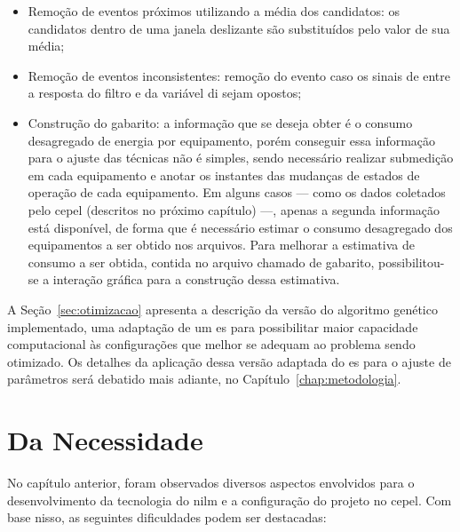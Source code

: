 \begin{itemize}
\item Remoção de eventos próximos utilizando a média dos candidatos:
os candidatos dentro de uma janela deslizante são substituídos pelo valor
de sua média;
\item Remoção de eventos inconsistentes: remoção do evento caso os
sinais de entre a resposta do filtro e da variável \acs{di} sejam
opostos;
\item Construção do gabarito: a informação que se deseja obter é o
consumo desagregado de energia por equipamento, porém conseguir essa 
informação para o ajuste das técnicas não é simples, sendo necessário
realizar submedição em cada equipamento e anotar os instantes das
mudanças de estados de operação de cada equipamento. Em alguns casos
--- como os dados coletados pelo \acs{cepel} (descritos no próximo
capítulo) ---, apenas a segunda informação está disponível, de forma
que é necessário estimar o consumo desagregado dos equipamentos a ser
obtido nos arquivos. Para melhorar a estimativa de consumo a ser
obtida, contida no arquivo chamado de gabarito, possibilitou-se a
interação gráfica para a construção dessa estimativa.
\end{itemize}

A Seção~\ref{sec:otimizacao} apresenta a descrição da versão do
algoritmo genético implementado, uma adaptação de um \gls{es} para
possibilitar maior capacidade computacional às configurações que
melhor se adequam ao problema sendo otimizado. Os detalhes da
aplicação dessa versão adaptada do \gls{es} para o ajuste de
parâmetros será debatido mais adiante, no
Capítulo~\ref{chap:metodologia}.

\section{Da Necessidade}
\label{sec:motivacao_framework}

No capítulo anterior, foram observados diversos aspectos envolvidos
para o desenvolvimento da tecnologia do \gls{nilm} e a configuração do
projeto no \gls{cepel}. Com base nisso, as seguintes dificuldades
podem ser destacadas:

